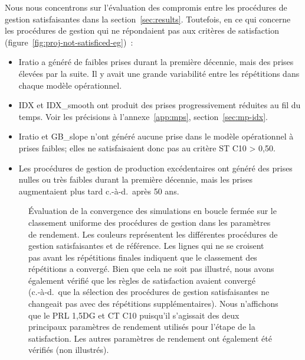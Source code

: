 \documentclass[11pt]{book}
\begin{document}
Nous nous concentrons sur l'évaluation des compromis entre les procédures de gestion satisfaisantes dans la section~\ref{sec:results}. Toutefois, en ce qui concerne les procédures de gestion qui ne répondaient pas aux critères de satisfaction (figure~\ref{fig:proj-not-satisficed-eg})~:
\begin{itemize}

\item
  Iratio a généré de faibles prises durant la première décennie, mais des prises élevées par la suite. Il y avait une grande variabilité entre les répétitions dans chaque modèle opérationnel.
\item
  IDX et IDX\_smooth ont produit des prises progressivement réduites au fil du temps. Voir les précisions à l'annexe~\ref{app:mps}, section~\ref{sec:mp-idx}.
\item
  Iratio et GB\_slope n'ont généré aucune prise dans le modèle opérationnel à prises faibles; elles ne satisfaisaient donc pas au critère ST C10 \textgreater{} 0,50.
\item
  Les procédures de gestion de production excédentaires ont généré des prises nulles ou très faibles durant la première décennie, mais les prises augmentaient plus tard c.-à-d.~après 50 ans.
\end{itemize}

\begin{figure}[htb]

{\centering {} 

}

\caption{Évaluation de la convergence des simulations en boucle fermée sur le classement uniforme des procédures de gestion dans les paramètres de rendement. Les couleurs représentent les différentes procédures de gestion satisfaisantes et de référence. Les lignes qui ne se croisent pas avant les répétitions finales indiquent que le classement des répétitions a convergé. Bien que cela ne soit pas illustré, nous avons également vérifié que les règles de satisfaction avaient convergé (c.‑à‑d.~que la sélection des procédures de gestion satisfaisantes ne changeait pas avec des répétitions supplémentaires). Nous n'affichons que le PRL 1,5DG et CT C10 puisqu'il s'agissait des deux principaux paramètres de rendement utilisés pour l'étape de la satisfaction. Les autres paramètres de rendement ont également été vérifiés (non illustrés).}\label{fig:converge}
\end{figure}
\end{document}
